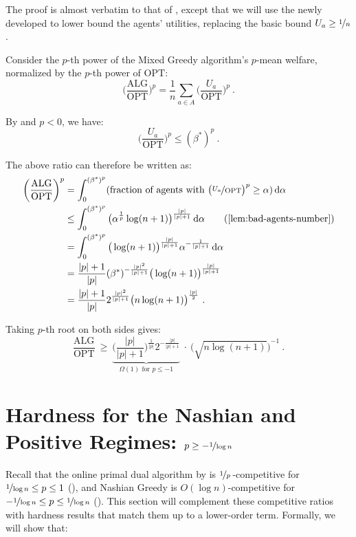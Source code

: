 \documentclass[11pt,letterpaper]{article}
\newcommand{\OPT}{\mathrm{OPT}}
\newcommand{\ALG}{\mathrm{ALG}}
\newcommand{\dif}[1]{\,\text{\rm d} #1}
\newcommand{\utility}{U}
\begin{document}
The proof is almost verbatim to that of , except that we will use the newly developed  to lower bound the agents' utilities, replacing the basic bound $\utility_a \ge \nicefrac{1}{n}$.

Consider the $p$-th power of the Mixed Greedy algorithm's $p$-mean welfare, normalized by the $p$-th power of $\OPT$:
\[
	\bigg( \frac{\ALG}{\OPT} \bigg)^p = \frac{1}{n} \sum_{a\in A} \bigg( \frac{\utility_a}{\OPT} \bigg)^p
	~.
\]

By  and $p < 0$, we have:
\[
	\bigg(\frac{\utility_a}{\OPT}\bigg)^p \le (\beta^*)^p
	~.
\]

The above ratio can therefore be written as:
\begin{align*}
	\bigg( \frac{\ALG}{\OPT} \bigg)^p
	& = \int_0^{(\beta^*)^p} (\text{fraction of agents with $\big( \nicefrac{\utility_a}{\OPT} \big)^p \ge \alpha$)} \dif{\alpha} \\
	&
	\le \int_0^{(\beta^*)^p} \big( \alpha^{\frac{1}{p}} \log(n+1) \big)^{\frac{|p|}{|p|+1}} \dif{\alpha} 
	\tag{\Cref{lem:bad-agents-number}} \\
	&
	= \int_0^{(\beta^*)^p} \big( \log(n+1) \big)^{\frac{|p|}{|p|+1}} \alpha^{-\frac{1}{|p|+1}} \dif{\alpha} \\
	&
	= \frac{|p|+1}{|p|} (\beta^*)^{-\frac{|p|^2}{|p|+1}} \big(\log(n+1) \big)^{\frac{|p|}{|p|+1}} \\
	&
	= \frac{|p|+1}{|p|} 2^{{\frac{|p|^2}{|p|+1}}} \big( n \log(n+1) \big)^{\frac{|p|}{2}}
	~.
\end{align*}

Taking $p$-th root on both sides gives:
\[
	\frac{\ALG}{\OPT} ~\ge~ \underbrace{\bigg( \frac{|p|}{|p|+1} \bigg)^{\frac{1}{|p|}} 2^{-{\frac{|p|}{|p|+1}}}}_{\text{$\Omega(1)$ for $p \le -1$}} ~\cdot~ {\Big(\sqrt{n \log(n+1)}\Big)}^{-1}
	~.
\]




 \section[Hardness for the Nashian and Positive Regimes]{Hardness for the Nashian and Positive Regimes: $p \ge -\nicefrac{1}{\log n}$}

Recall that the online primal dual algorithm by \citet{DevanurJ:STOC:2012} is $\nicefrac{1}{p}$\,-competitive for $\nicefrac{1}{\log n} \le p \le 1$ (), and Nashian Greedy is $O(\log n)$-competitive for $- \nicefrac{1}{\log n} \le p \le \nicefrac{1}{\log n}$ ().
This section will complement these competitive ratios with hardness results that match them up to a lower-order term.
Formally, we will show that:
\end{document}

